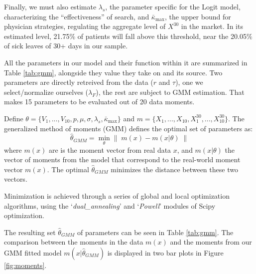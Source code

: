 \documentclass[../main.tex]{subfiles}
\begin{document}
Finally, we must also estimate $\lambda_s$, the parameter specific for the Logit model, characterizing the ``effectiveness'' of search, and $\bar{\kappa}_{\max}$, the upper bound for physician strategies, regulating the aggregate level of $X^{30}$ in the market. In its estimated level, 21.75\% of patients will fall above this threshold, near the 20.05\% of sick leaves of 30+ days in our sample.

All the parameters in our model and their function within it are summarized in Table \ref{tab:gmm}, alongside they value they take on and its source. Two parameters are directly retreived from the data ($r$ and $\tau$), one we select/normalize ourselves ($\lambda_F$), the rest are subject to GMM estimation. That makes 15 parameters to be evaluated out of 20 data moments.

Define $\theta = \{V_1, ..., V_{10}, p, \mu, \sigma, \lambda_s, \bar{\kappa}_{\max}\}$ and $m = \{X_1, ..., X_{10}, X_1^{30}, ..., X_{10}^{30}\}$. The generalized method of moments (GMM) defines the optimal set of parameters as:
\begin{equation}
    \hat{\theta}_{GMM} = \min_{\theta} \left\| \; m(x) - m(x|\theta)\; \right\|
\end{equation}
where $m(x)$ are is the moment vector from real data $x$, and $m(x|\theta)$ the vector of moments from the model that correspond to the real-world moment vector $m(x)$. The optimal $\hat{\theta}_{GMM}$ minimizes the distance between these two vectors.

Minimization is achieved through a series of global and local optimization algorithms, using the `\textit{dual\_annealing}' and `\textit{Powell}' modules of Scipy optimization.


The resulting set $\hat{\theta}_{GMM}$ of parameters can be seen in Table \ref{tab:gmm}. The comparison between the moments in the data $m(x)$ and the moments from our GMM fitted model $m(x|\hat{\theta}_{GMM})$ is displayed in two bar plots in Figure \ref{fig:moments}.
\end{document}
